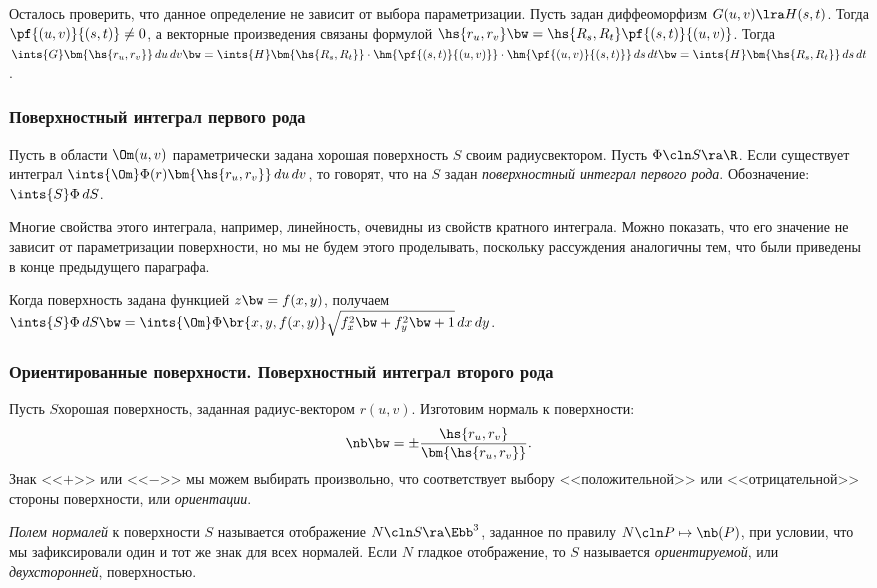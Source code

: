 \documentclass[a4paper]{article}
\begin{document}
Осталось проверить, что данное определение не зависит от выбора параметризации. Пусть задан диффеоморфизм
$G(u,v) \lra H(s,t)$. Тогда $\pf{(u,v)}{(s,t)} \neq 0$, а векторные произведения связаны формулой $\hs{r_u,
r_v} \bw= \hs{R_s, R_t} \pf{(s,t)}{(u,v)}$. Тогда $\ints{G}\bm{\hs{r_u, r_v}}\,d u\,d v \bw=
\ints{H}\bm{\hs{R_s, R_t}}\cdot\hm{\pf{(s,t)}{(u,v)}}\cdot\hm{\pf{(u,v)}{(s,t)}}\,d s\,d t\bw=
\ints{H}\bm{\hs{R_s, R_t}}\,d s\,d t$.

\subsubsection{Поверхностный интеграл первого рода}

\begin{df}
Пусть в области $\Om(u,v)$ параметрически задана хорошая поверхность $S$ своим радиус\д вектором. Пусть
$\Phi\cln S\ra \R$. Если существует интеграл $\ints{\Om}\Phi(r)\bm{\hs{r_u, r_v}}\,d u \,d v$, то говорят,
что на $S$ задан \emph{поверхностный интеграл первого рода}. Обозначение: $\ints{S}\Phi\,d S$.
\end{df}

Многие свойства этого интеграла, например, линейность, очевидны из свойств кратного интеграла. Можно
показать, что его значение не зависит от параметризации поверхности, но мы не будем этого проделывать,
поскольку рассуждения аналогичны тем, что были приведены в конце предыдущего параграфа.

Когда поверхность задана функцией $z \bw= f(x,y)$, получаем $\ints{S}\Phi\,d S \bw=
\ints{\Om}\Phi\br{x,y,f(x,y)}\sqrt{f_x^2 \bw+ f_y^2 \bw+ 1}\,d x \,d y$.

\subsubsection{Ориентированные поверхности. Поверхностный интеграл второго рода}

Пусть $S$\т хорошая поверхность, заданная радиус-вектором $r(u,v)$. Изготовим нормаль к поверхности:
$$\nb \bw= \pm \frac{\hs{r_u, r_v}}{\bm{\hs{r_u,r_v}}}.$$
Знак <<$+$>> или <<$-$>> мы можем выбирать произвольно, что соответствует выбору <<положительной>>
или <<отрицательной>> стороны поверхности, или \emph{ориентации}.

\begin{df}
\emph{Полем нормалей} к поверхности $S$ называется отображение $N\cln S \ra \Ebb^3$, заданное по правилу
$N\cln P \mapsto \nb(P)$, при условии, что мы зафиксировали один и тот же знак для всех нормалей. Если $N$\т
гладкое отображение, то $S$ называется \emph{ориентируемой}, или \emph{двухсторонней}, поверхностью.
\end{df}
\end{document}
